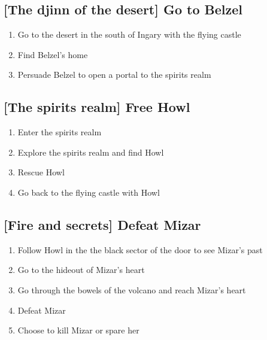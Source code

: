 \subsection{[The djinn of the desert] Go to Belzel}
\begin{enumerate}
\item Go to the desert in the south of Ingary with the flying castle
\item Find Belzel's home
\item Persuade Belzel to open a portal to the spirits realm
\end{enumerate}

\subsection{[The spirits realm] Free Howl}
\begin{enumerate}
\item Enter the spirits realm
\item Explore the spirits realm and find Howl
\item Rescue Howl
\item Go back to the flying castle with Howl
\end{enumerate}

\subsection{[Fire and secrets] Defeat Mizar}
\begin{enumerate}
\item Follow Howl in the the black sector of the door to see Mizar's past
\item Go to the hideout of Mizar's heart
\item Go through the bowels of the volcano and reach Mizar's heart
\item Defeat Mizar
\item Choose to kill Mizar or spare her
\end{enumerate}
